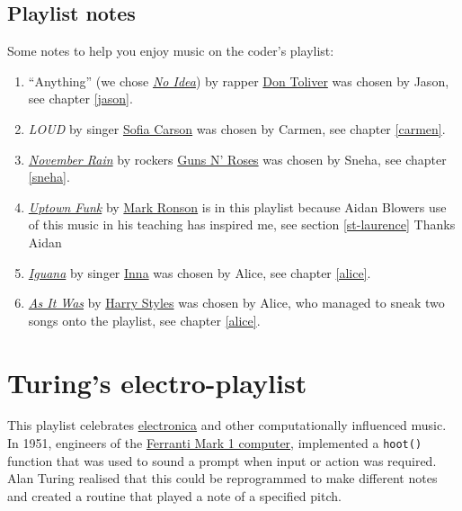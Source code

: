 \documentclass[
]{book}
\providecommand{\tightlist}{%
  \setlength{\itemsep}{0pt}\setlength{\parskip}{0pt}}
\begin{document}
\hypertarget{codersnotes}{%
\subsection{Playlist notes}\label{codersnotes}}

Some notes to help you enjoy music on the coder's playlist:

\begin{enumerate}
\def\labelenumi{\arabic{enumi}.}
\tightlist
\item
  ``Anything'' (we chose \emph{\href{https://en.wikipedia.org/wiki/No_Idea_(song)}{No Idea}}) by rapper \href{https://en.wikipedia.org/wiki/Don_Toliver}{Don Toliver} was chosen by Jason, see chapter \ref{jason}. \citep{noidea}
\item
  \emph{LOUD} by singer \href{https://en.wikipedia.org/wiki/Sofia_Carson}{Sofia Carson} was chosen by Carmen, see chapter \ref{carmen}. \citep{loud}
\item
  \emph{\href{https://en.wikipedia.org/wiki/November_Rain}{November Rain}} by rockers \href{https://en.wikipedia.org/wiki/Guns_N\%27_Roses}{Guns N' Roses} was chosen by Sneha, see chapter \ref{sneha}. \citep{novemberrain}
\item
  \emph{\href{https://en.wikipedia.org/wiki/Uptown_Funk}{Uptown Funk}} by \href{https://en.wikipedia.org/wiki/Mark_Ronson}{Mark Ronson} is in this playlist because Aidan Blowers use of this music in his teaching has inspired me, see section \ref{st-laurence} Thanks Aidan 🙏 \citep{uptownfunk, blowers}
\item
  \emph{\href{https://en.wikipedia.org/wiki/Iguana_(song)}{Iguana}} by singer \href{https://en.wikipedia.org/wiki/Inna}{Inna} was chosen by Alice, see chapter \ref{alice}. \citep{iguana}
\item
  \emph{\href{https://en.wikipedia.org/wiki/As_It_Was}{As It Was}} by \href{https://en.wikipedia.org/wiki/Harry_Styles}{Harry Styles} was chosen by Alice, who managed to sneak two songs onto the playlist, see chapter \ref{alice}. \citep{asitwas}
\end{enumerate}

\hypertarget{electronica}{%
\section{Turing's electro-playlist}\label{electronica}}

This playlist celebrates \href{https://en.wikipedia.org/wiki/Electronica}{electronica} and other computationally influenced music. In 1951, engineers of the \href{https://en.wikipedia.org/wiki/Ferranti_Mark_1}{Ferranti Mark 1 computer}, implemented a \texttt{hoot()} function that was used to sound a prompt when input or action was required. \citep{turingmanual} Alan Turing realised that this could be reprogrammed to make different notes and created a routine that played a note of a specified pitch. \citep{hooturing}
\end{document}
